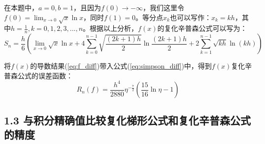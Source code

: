 在本题中，$a=0,b=1$，且因为$f(0) \rightarrow -\infty$，我们这里令$f(0) = \lim_{x \rightarrow 0} \sqrt{x} \ln x$，同时$f(1) = 0$。等分点$x_k$也可以写作：$x_k = kh$，其中$h = \frac{1}{n},k=0,1,2,3,...,n$。根据以上分析，$f(x)$的复化辛普森公式可以写为：
\begin{equation}
    S_n = \frac{h}{6} \left(\lim_{x\rightarrow 0} \sqrt{x} \ln x + 4 \sum_{k=0}^{n-1} \sqrt{\frac{(2k+1)h}{2}} \ln \frac{(2k+1)h}{2} + 2\sum_{k=1}^{n-1} \sqrt{kh} \ln (kh)\right)
    \label{eq:compound_simpson_f}
\end{equation}

将$f(x)$的导数结果(\ref{eq:f_diff})带入公式(\ref{eq:simpson_diff})中，得到$f(x)$复化辛普森公式的误差函数：
\begin{equation}
    R_n(f) = \frac{h^4}{2880} \eta^{-\frac{7}{2}} (\frac{15}{16} \ln \eta - 1)
    \label{eq:compound_simpson_R_f}
\end{equation}

\subsection*{1.3 与积分精确值比较复化梯形公式和复化辛普森公式的精度}

